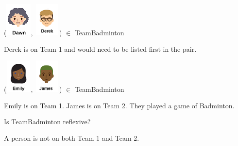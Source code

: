 \documentclass{ximera}
\begin{document}
\begin{exercise}

 ({\includegraphics[width=50px,height=65px]{pics/people/dawn.png}}, {\includegraphics[width=50px,height=65px]{pics/people/derek.png}}) $\in$ TeamBadminton 

  \begin{multipleChoice}
  \end{multipleChoice}
  \begin{feedback}
Derek is on Team 1 and would need to be listed first in the pair.
  \end{feedback}
\end{exercise}





\begin{exercise}



 ({\includegraphics[width=50px,height=65px]{pics/people/emily.png}}, {\includegraphics[width=50px,height=65px]{pics/people/james.png}}) $\in$ TeamBadminton 

  \begin{multipleChoice}
  \end{multipleChoice}
  \begin{feedback}
Emily is on Team 1. James is on Team 2.  They played a game of Badminton.
  \end{feedback}
\end{exercise}



\begin{exercise}
Is TeamBadminton reflexive?

  \begin{multipleChoice}
  \end{multipleChoice}
  \begin{feedback}
A person is not on both Team 1 and Team 2.
  \end{feedback}
\end{exercise}
\end{document}
